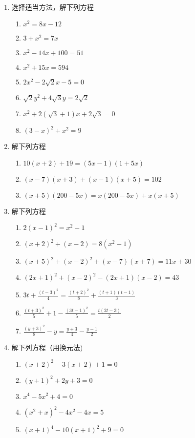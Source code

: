 \begin{enumerate}
\item 选择适当方法，解下列方程
\begin{multicols}{2}
    \begin{enumerate}
\item $x^2=8x-12$
\item $3+x^2=7x$
\item $x^2-14x+100=51$
\item $x^2+15x=594$
\item $2x^2-2\sqrt{2}x-5=0$
\item $\sqrt{2}y^2+4\sqrt{3}y=2\sqrt{2}$
\item $x^2+2(\sqrt{3}+1)x+2\sqrt{3}=0$
\item $(3-x)^2+x^2=9$
\end{enumerate}
\end{multicols}
\item 解下列方程
    \begin{enumerate}
\item $10(x+2)+19=(5x-1)(1+5x)$
\item $(x-7)(x+3) + (x-1) (x+5)=102$
\item $(x+5)(200-5x)=x(200-5x)+x(x+5)$
\end{enumerate}

\item 解下列方程
    \begin{enumerate}
\item $2(x-1)^2=x^2-1$
\item $(x+2)^2+(x-2)=8(x^2+1)$
\item $(x+5)^2+(x-2)^2+(x-7)(x+7)=11x+30$
\item $(2x+1)^2+(x-2)^2-(2x+1)(x-2)=43$
\item  $3 t+\frac{(t-3)^{2}}{4}=\frac{(t+2)^{2}}{8}+\frac{(t+1)(t-1)}{3}$
\item $\frac{(t+3)^{2}}{5}+1-\frac{(3 t-1)^{2}}{5}=\frac{t(2 t-3)}{2}$
\item $\frac{(y+3)^{2}}{8}-y=\frac{y+3}{4}-\frac{y-1}{2}$
\end{enumerate}

\item  解下列方程（用换元法)   
\begin{multicols}{2}
 \begin{enumerate}
\item $(x+2)^{2}-3(x+2)+1=0$
\item  $(y+1)^{2}+2 y+3=0$
\item $x^{4}-5 x^{2}+4=0$
\item  $\left(x^{2}+x\right)^{2}-4 x^{2}-4 x=5$
\item $(x+1)^{4}-10(x+1)^{2}+9=0$
\end{enumerate}
\end{multicols}


\end{enumerate}
